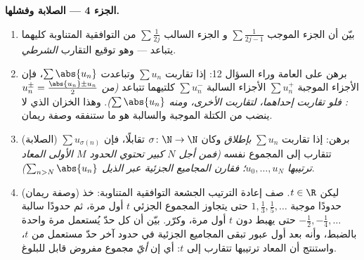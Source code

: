 \begin{problem}[{مسألة نهاية الأسبوع --- $H_n = \ln n + \gamma +
\frac{1}{2n} + O(n^{-2})$، وإعادة ترتيب $1 - \frac12 +
\frac13 - \dots$ إلى $\frac{\ln 2}{2}$}]
\medskip
\noindent\textbf{الجزء 4 --- الصلابة وفشلها.}
\begin{enumerate}[resume]
  \item بيّن أن الجزء الموجب $\sum \frac{1}{2j-1}$ و
        الجزء السالب $\sum \frac{1}{2j}$ من  التوافقية
        المتناوبة كليهما يتباعد --- وهو توقيع
        التقارب \emph{الشرطي}.
  \item برهن على  العامة وراء السؤال 12: إذا
        تقاربت $\sum u_n$ وتباعدت $\sum \abs{u_n}$، فإن
         الأجزاء الموجبة $\sum u_n^+$  الأجزاء
        السالبة $\sum u_n^-$ كلتيهما تتباعد \emph{(من
        $u_n^\pm = \frac{\abs{u_n} \pm u_n}{2}$: فلو تقاربت
        إحداهما، لتقاربت الأخرى، ومنه $\sum\abs{u_n}$)}.
        وهذا الخزان الذي لا ينضب من الكتلة الموجبة والسالبة
        هو ما ستنفقه وصفة ريمان.
  \item (الصلابة) برهن: إذا تقاربت $\sum u_n$
        \emph{بإطلاق} وكان $\sigma \colon \N \to \N$
        تقابلًا، فإن $\sum u_{\sigma(n)}$ تتقارب إلى
        المجموع نفسه \emph{(فمن أجل $N$ كبير تحتوي الحدود $M$ الأولى
        المعاد ترتيبها $u_0, \dots, u_N$؛ فقارن المجاميع الجزئية
        عبر الذيل $\sum_{n > N}\abs{u_n}$)}.
  \item (وصفة ريمان) ليكن $t \in \R$. صف إعادة الترتيب
        الجشعة  التوافقية المتناوبة: خذ
        حدودًا موجبة $1, \frac13, \frac15, \dots$ حتى يتجاوز
        المجموع الجزئي $t$ أول مرة، ثم حدودًا سالبة
        $-\frac12, -\frac14, \dots$ حتى يهبط دون
        $t$ أول مرة، وكرّر. بيّن أن كل حدّ يُستعمل مرة واحدة
        بالضبط، وأنه بعد أول عبور تبقى المجاميع الجزئية
        في حدود آخر حدّ مستعمل من $t$، واستنتج أن
         المعاد ترتيبها تتقارب إلى $t$: أي إن \emph{أيّ}
        مجموع مفروض قابل للبلوغ.
\end{enumerate}


\end{problem}
